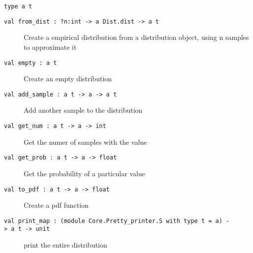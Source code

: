 \protect\hyperlink{type-t}{}\texttt{type\ \textquotesingle{}a\ t}

\begin{description}
\item[{\protect\hyperlink{val-fromux5fdist}{}\texttt{val\ from\_dist\ :\ ?⁠n:int\ -\textgreater{}\ \textquotesingle{}a\ Dist.dist\ -\textgreater{}\ \textquotesingle{}a\ t}}]
Create a empirical distribution from a distribution object, using n
samples to approximate it
\end{description}

\begin{description}
\item[{\protect\hyperlink{val-empty}{}\texttt{val\ empty\ :\ \textquotesingle{}a\ t}}]
Create an empty distribution
\end{description}

\begin{description}
\item[{\protect\hyperlink{val-addux5fsample}{}\texttt{val\ add\_sample\ :\ \textquotesingle{}a\ t\ -\textgreater{}\ \textquotesingle{}a\ -\textgreater{}\ \textquotesingle{}a\ t}}]
Add another sample to the distribution
\end{description}

\begin{description}
\item[{\protect\hyperlink{val-getux5fnum}{}\texttt{val\ get\_num\ :\ \textquotesingle{}a\ t\ -\textgreater{}\ \textquotesingle{}a\ -\textgreater{}\ int}}]
Get the numer of samples with the value
\end{description}

\begin{description}
\item[{\protect\hyperlink{val-getux5fprob}{}\texttt{val\ get\_prob\ :\ \textquotesingle{}a\ t\ -\textgreater{}\ \textquotesingle{}a\ -\textgreater{}\ float}}]
Get the probability of a particular value
\end{description}

\begin{description}
\item[{\protect\hyperlink{val-toux5fpdf}{}\texttt{val\ to\_pdf\ :\ \textquotesingle{}a\ t\ -\textgreater{}\ \textquotesingle{}a\ -\textgreater{}\ float}}]
Create a pdf function
\end{description}

\begin{description}
\item[{\protect\hyperlink{val-printux5fmap}{}\texttt{val\ print\_map\ :\ (module\ Core.Pretty\_printer.S\ with\ type\ t\ =\ \textquotesingle{}a)\ -\textgreater{}\ \textquotesingle{}a\ t\ -\textgreater{}\ unit}}]
print the entire distribution
\end{description}

